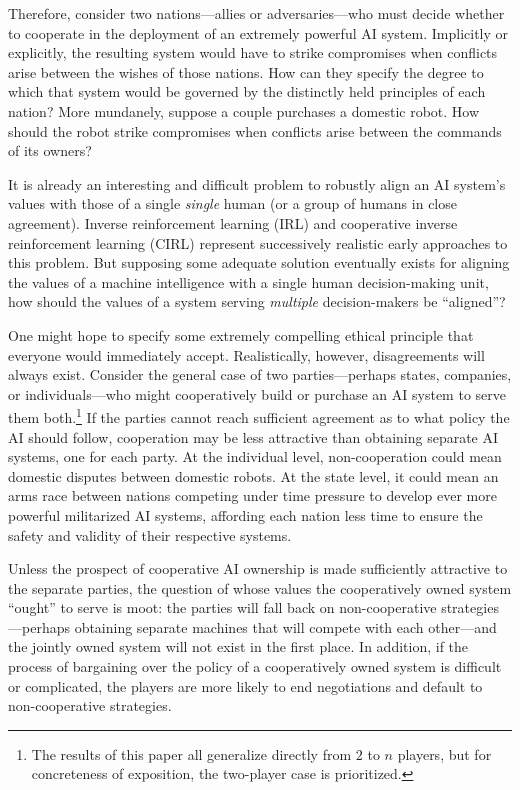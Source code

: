 \documentclass{article}
\begin{document}
Therefore, consider two nations---allies or adversaries---who must decide whether to cooperate in the deployment of an extremely powerful AI system.  Implicitly or explicitly, the resulting system would have to strike compromises when conflicts arise between the wishes of those nations.  How can they specify the degree to which that system would be governed by the distinctly held principles of each nation?  More mundanely, suppose a couple purchases a domestic robot.  How should the robot strike compromises when conflicts arise between the commands of its owners?

It is already an interesting and difficult problem to robustly align an AI system's values with those of a single \emph{single} human (or a group of humans in close agreement).  Inverse reinforcement learning (IRL) \citep{russell1998learning} \citep{ng2000algorithms} \citep{abbeel2004apprenticeship} and cooperative inverse reinforcement learning (CIRL) \citep{hadfield2016cooperative} represent successively realistic early approaches to this problem.  But supposing some adequate solution eventually exists for aligning the values of a machine intelligence with a single human decision-making unit, how should the values of a system serving \emph{multiple} decision-makers be ``aligned''?

One might hope to specify some extremely compelling ethical principle that everyone would immediately accept.  Realistically, however, disagreements will always exist.  Consider the general case of two parties---perhaps states, companies, or individuals---who might cooperatively build or purchase an AI system to serve them both.\footnote{The results of this paper all generalize directly from $2$ to $n$ players, but for concreteness of exposition, the two-player case is prioritized.}   If the parties cannot reach sufficient agreement as to what policy the AI should follow, cooperation may be less attractive than obtaining separate AI systems, one for each party.  At the individual level, non-cooperation could mean domestic disputes between domestic robots.  At the state level, it could mean an arms race between nations competing under time pressure to develop ever more powerful militarized AI systems, affording each nation less time to ensure the safety and validity of their respective systems.

Unless the prospect of cooperative AI ownership is made sufficiently attractive to the separate parties, the question of whose values the cooperatively owned system ``ought'' to serve is moot:  the parties will fall back on non-cooperative strategies---perhaps obtaining separate machines that will compete with each other---and the jointly owned system will not exist in the first place.   In addition, if the process of bargaining over the policy of a cooperatively owned system is difficult or complicated, the players are more likely to end negotiations and default to non-cooperative strategies. 
\end{document}
